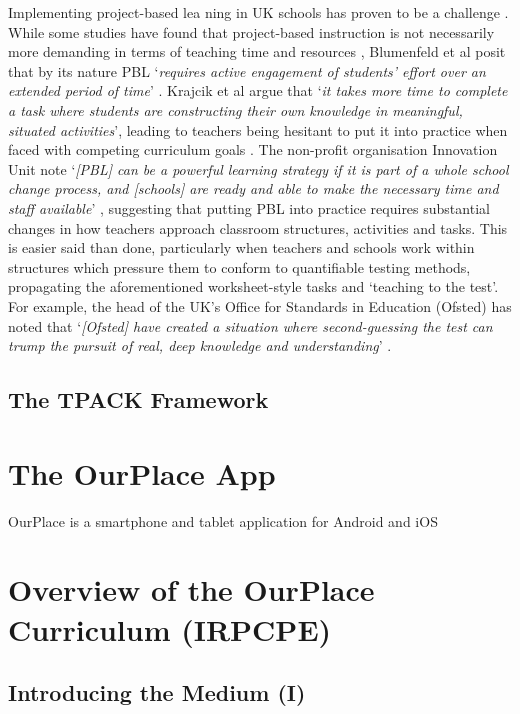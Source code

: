 \documentclass{sigchi}
\begin{document}
Implementing project-based lea
ning in UK schools has proven to be a challenge \cite{TheEducationEndowmentFoundation2016}. While some studies have found that project-based instruction is not necessarily more demanding in terms of teaching time and resources \cite{Al-Balushi2014}, Blumenfeld et al posit that by its nature PBL `\textit{requires active engagement of students' effort over an extended period of time}' \cite{Blumenfeld1991}. Krajcik et al argue that `\textit{it takes more time to complete a task where students are constructing their own knowledge in meaningful, situated activities}', leading to teachers being hesitant to put it into practice when faced with competing curriculum goals \cite{Krajcik2006}. The non-profit organisation Innovation Unit note `\textit{[PBL] can be a powerful learning strategy if it is part of a whole school change process, and [schools] are ready and able to make the necessary time and staff available}' \cite{InnovationUnit2016}, suggesting that putting PBL into practice requires substantial changes in how teachers approach classroom structures, activities and tasks. This is easier said than done, particularly when teachers and schools work within structures which pressure them to conform to quantifiable testing methods, propagating the aforementioned worksheet-style tasks and `teaching to the test'. For example, the head of the UK's Office for Standards in Education (Ofsted) has noted that `\textit{[Ofsted] have created a situation where second-guessing the test can trump the pursuit of real, deep knowledge and understanding}' \cite{Ofsted2018}. 

\subsection{The TPACK Framework}

\section{The OurPlace App}

OurPlace is a smartphone and tablet application for Android and iOS

\section{Overview of the OurPlace Curriculum (IRPCPE)}

\subsection{Introducing the Medium (I)}
\end{document}
